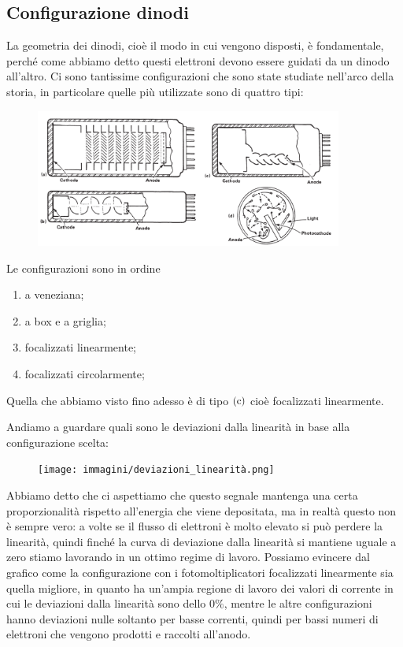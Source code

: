 \subsection{Configurazione dinodi}
La geometria dei dinodi, cioè il modo in cui vengono disposti, è fondamentale, perché come abbiamo detto questi elettroni devono essere guidati da un dinodo all'altro. Ci sono tantissime configurazioni che sono state studiate nell'arco della storia, in particolare quelle più utilizzate sono di quattro tipi:
\begin{figure}[H]
   \centering
   \includegraphics[width=0.9\textwidth]{immagini/geometrie_dinodi.png}
\end{figure}
Le configurazioni sono in ordine
\begin{enumerate}[label=(\alph*)]
   \item a veneziana;
   \item a box e a griglia;
   \item focalizzati linearmente;
   \item focalizzati circolarmente;
\end{enumerate}
Quella che abbiamo visto fino adesso è di tipo $\rm (c)$ cioè focalizzati linearmente.

Andiamo a guardare quali sono le deviazioni dalla linearità in base alla configurazione scelta:
\begin{figure}[H]
   \centering
   \texttt{[image: immagini/deviazioni\_linearità.png]}
\end{figure}
Abbiamo detto che ci aspettiamo che questo segnale mantenga una certa proporzionalità rispetto all'energia che viene depositata, ma in realtà questo non è sempre vero: a volte se il flusso di elettroni è molto elevato si può perdere la linearità, quindi finché la curva di deviazione dalla linearità si mantiene uguale a zero stiamo lavorando in un ottimo regime di lavoro. Possiamo evincere dal grafico come la configurazione con i fotomoltiplicatori focalizzati linearmente sia quella migliore, in quanto ha un'ampia regione di lavoro dei valori di corrente in cui le deviazioni dalla linearità sono dello $0\%$, mentre le altre configurazioni hanno deviazioni nulle soltanto per basse correnti, quindi per bassi numeri di elettroni che vengono prodotti e raccolti all'anodo.

